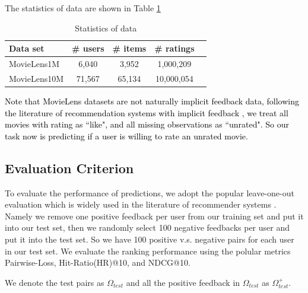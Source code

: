 \documentclass[conference]{IEEEtran}
\numberwithin{equation}{section}
\newcommand{\laks}[1]{\textcolor{black}{#1}}
\newtheorem{sampling strategy}{Sampling Strategy}
\begin{document}
The statistics of data are shown in Table \ref{tab:data}

\begin{table}[t]
\small
\caption{Statistics of data}
\label{tab:data}
\vskip 0.15in
\begin{center}
\begin{small}
\begin{sc}
\begin{tabular}{lcccr}  \hline
Data set & \# users & \# items & \# ratings \\ \hline
MovieLens1M   & 6,040 & 3,952 & 1,000,209 \\
MovieLens10M  & 71,567 & 65,134 & 10,000,054 \\ \hline
\end{tabular}
\end{sc}
\end{small}
\end{center}
\end{table}

\laks{Note that MovieLens datasets are not naturally implicit feedback data, following the literature of recommendation systems with implicit feedback \cite{bpr, neural}, we treat all movies with rating as ``like", and all missing observations as   ``unrated". So our task now is predicting if a user is willing to rate an unrated movie.} 


\subsection{Evaluation Criterion}

To evaluate the performance of predictions, we adopt the popular leave-one-out evaluation which is widely used in the literature of recommender systems \cite{bpr, neural}. Namely we remove one positive feedback per user from our training set and put it into our test set, then we randomly select 100 negative feedbacks per user and put it into the test set. So we have 100 positive v.s. negative pairs for each user in our test set. We evaluate the ranking performance using the polular metrics  \textsf{Pairwise-Loss}, \textsf{Hit-Ratio(HR)@10}, and \textsf{NDCG@10}. 

We denote the test pairs as $\Omega_{test}$ and all the positive feedback in $\Omega_{test}$ as ${\Omega}_{test}^+$.
\end{document}
